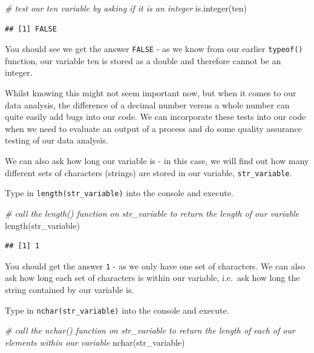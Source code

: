 \documentclass[
]{book}
\newenvironment{Shaded}{\begin{snugshade}}{\end{snugshade}}
\newcommand{\CommentTok}[1]{\textcolor[rgb]{0.56,0.35,0.01}{\textit{#1}}}
\newcommand{\FunctionTok}[1]{\textcolor[rgb]{0.00,0.00,0.00}{#1}}
\newcommand{\NormalTok}[1]{#1}
\begin{document}
\begin{Shaded}
\begin{Highlighting}[]
\CommentTok{\# test our ten variable by asking if it is an integer}
\FunctionTok{is.integer}\NormalTok{(ten)}
\end{Highlighting}
\end{Shaded}

\begin{verbatim}
## [1] FALSE
\end{verbatim}

You should see we get the answer \texttt{FALSE} - as we know from our earlier \texttt{typeof()} function, our variable ten is stored as a double and therefore cannot be an integer.

Whilst knowing this might not seem important now, but when it comes to our data analysis, the difference of a decimal number versus a whole number can quite easily add bugs into our code. We can incorporate these tests into our code when we need to evaluate an output of a process and do some quality assurance testing of our data analysis.

We can also ask how long our variable is - in this case, we will find out how many different sets of characters (strings) are stored in our variable, \texttt{str\_variable}.

Type in \texttt{length(str\_variable)} into the console and execute.

\begin{Shaded}
\begin{Highlighting}[]
\CommentTok{\# call the length() function on str\_variable to return the length of our variable}
\FunctionTok{length}\NormalTok{(str\_variable)}
\end{Highlighting}
\end{Shaded}

\begin{verbatim}
## [1] 1
\end{verbatim}

You should get the answer \texttt{1} - as we only have one set of characters. We can also ask how long each set of characters is within our variable, i.e.~ask how long the string contained by our variable is.

Type in \texttt{nchar(str\_variable)} into the console and execute.

\begin{Shaded}
\begin{Highlighting}[]
\CommentTok{\# call the nchar() function on str\_variable to return the length of each of our elements within our variable}
\FunctionTok{nchar}\NormalTok{(str\_variable)}
\end{Highlighting}
\end{Shaded}
\end{document}
